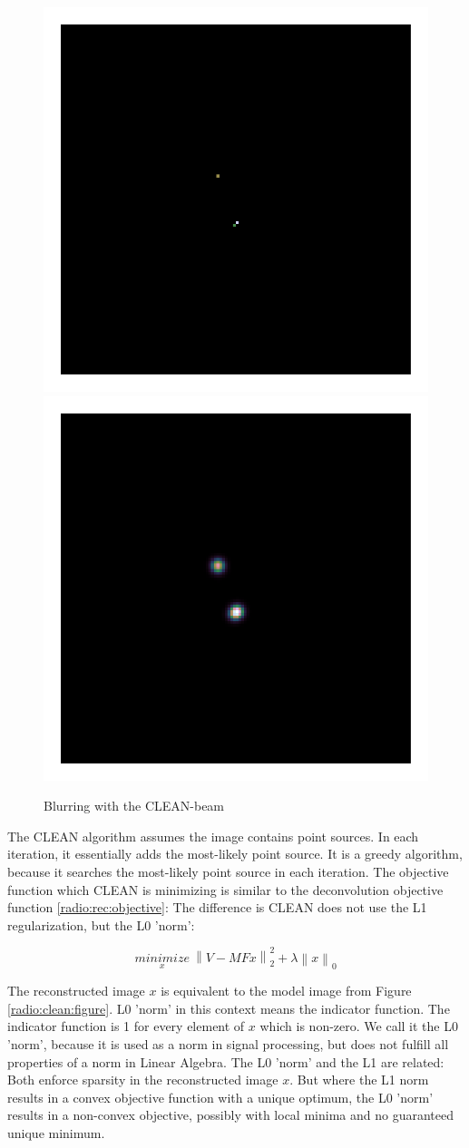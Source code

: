 \begin{figure}[h]
	\centering
	\includegraphics[width=0.25\linewidth, clip, trim= 1.0in 1.0in 1.0in 1.0in]{./chapters/01.intro/cleanExample/model_CLEAN_3.png}
	\includegraphics[width=0.25\linewidth, clip, trim= 1.0in 1.0in 1.0in 1.0in]{./chapters/01.intro/cleanExample/rec_CLEAN.png}
	\caption{Blurring with the CLEAN-beam}
	\label{radio:clean:beam}
\end{figure}

The CLEAN algorithm assumes the image contains point sources. In each iteration, it essentially adds the most-likely point source. It is a greedy algorithm, because it searches the most-likely point source in each iteration. The objective function which CLEAN is minimizing is similar to the deconvolution objective function \eqref{radio:rec:objective}: The difference is CLEAN does not use the L1 regularization, but the L0 'norm':

\begin{equation}\label{radio:clean:l0}
\underset{x}{minimize} \: \left \| V - MFx \right \|_2^2 + \lambda \left \| x \right \|_0
\end{equation}

The reconstructed image $x$ is equivalent to the model image from Figure \ref{radio:clean:figure}. L0 'norm' in this context means the indicator function. The indicator function is 1 for every element of $x$ which is non-zero.  We call it the L0 'norm', because it is used as a norm in signal processing, but does not fulfill all properties of a norm in Linear Algebra.   The L0 'norm' and the L1 are related: Both enforce sparsity in the reconstructed image $x$. But where the L1 norm results in a convex objective function with a unique optimum, the L0 'norm' results in a non-convex objective, possibly with local minima and no guaranteed unique minimum. 

